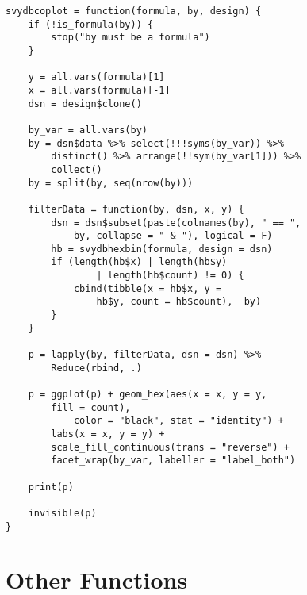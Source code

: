 \begin{lstlisting}
svydbcoplot = function(formula, by, design) {
    if (!is_formula(by)) {
        stop("by must be a formula")
    }
    
    y = all.vars(formula)[1]
    x = all.vars(formula)[-1]
    dsn = design$clone()
    
    by_var = all.vars(by)
    by = dsn$data %>% select(!!!syms(by_var)) %>% 
        distinct() %>% arrange(!!sym(by_var[1])) %>% 
        collect()
    by = split(by, seq(nrow(by)))
    
    filterData = function(by, dsn, x, y) {
        dsn = dsn$subset(paste(colnames(by), " == ", 
            by, collapse = " & "), logical = F)
        hb = svydbhexbin(formula, design = dsn)
        if (length(hb$x) | length(hb$y) 
                | length(hb$count) != 0) {
            cbind(tibble(x = hb$x, y = 
                hb$y, count = hb$count),  by)
        }
    }
    
    p = lapply(by, filterData, dsn = dsn) %>% 
        Reduce(rbind, .)
    
    p = ggplot(p) + geom_hex(aes(x = x, y = y, 
        fill = count), 
            color = "black", stat = "identity") + 
        labs(x = x, y = y) + 
        scale_fill_continuous(trans = "reverse") + 
        facet_wrap(by_var, labeller = "label_both")
    
    print(p)
    
    invisible(p)
}
\end{lstlisting}


\section{Other Functions} \label{appena:otherfunc}

